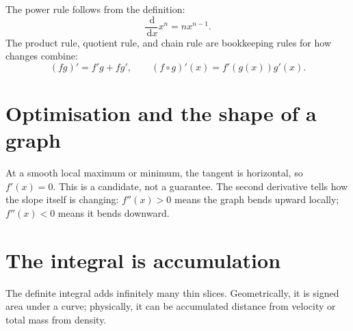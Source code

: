 \documentclass[11pt,oneside,openany]{book}
\newcommand{\dd}{\,\mathrm{d}}
\begin{document}
The power rule follows from the definition:
\[
  \frac{\dd}{\dd x}x^n=nx^{n-1}.
\]
The product rule, quotient rule, and chain rule are bookkeeping rules for how changes combine:
\[
  (fg)'=f'g+fg',\qquad (f\circ g)'(x)=f'(g(x))g'(x).
\]

\section{Optimisation and the shape of a graph}

At a smooth local maximum or minimum, the tangent is horizontal, so $f'(x)=0$. This is a candidate, not a guarantee. The second derivative tells how the slope itself is changing: $f''(x)>0$ means the graph bends upward locally; $f''(x)<0$ means it bends downward.

\begin{center}
\end{center}

\section{The integral is accumulation}

The definite integral adds infinitely many thin slices. Geometrically, it is signed area under a curve; physically, it can be accumulated distance from velocity or total mass from density.

\begin{center}
\end{center}
\end{document}
